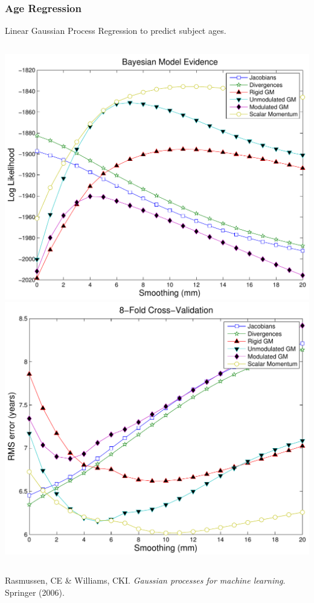 \begin{frame}
\frametitle{Age Regression}
Linear Gaussian Process Regression to predict subject ages.
\begin{columns}[c]
\includegraphics[width=1\textwidth]{age_loglikelihood}
\includegraphics[width=1\textwidth]{age_rms}
\end{columns}

\begin{tiny}
Rasmussen, CE \& Williams, CKI. \emph{Gaussian processes for machine learning}. Springer (2006).

\end{tiny}
\end{frame}

